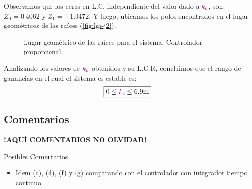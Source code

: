 Observamos que los ceros en L.C, independiente del valor dado a \(\mathbin{\color{violet}k_c}\),
son $Z_{0} = 0.4062 $ y $Z_{1} = -1.0472$. Y luego, ubicamos los polos encontrados
en el lugar geométricos de las raíces (\autoref{fig:lgr-j2}).

\begin{figure}[ht]
  \centering
  
  \caption{Lugar geométrico de las raíces para el sistema. Controlador proporcional.}
  \label{fig:lgr-j2}
\end{figure}


Analizando los valores de \(\mathbin{\color{violet}k_c}\) obtenidos y su L.G.R, concluimos que el
rango de ganancias en el cual el sistema es estable es:
\begin{equation}
  \boxed{ 0 \leq \mora{k_{c}} \leq 6.9\unit{m} }
\end{equation}

\subsection{Comentarios}


\textbf{!AQUÍ COMENTARIOS NO OLVIDAR!}

Posibles Comentarios
\begin{itemize}
    \item Idem (c), (d), (f) y (g) comparando con el controlador con integrador tiempo continuo
\end{itemize}
